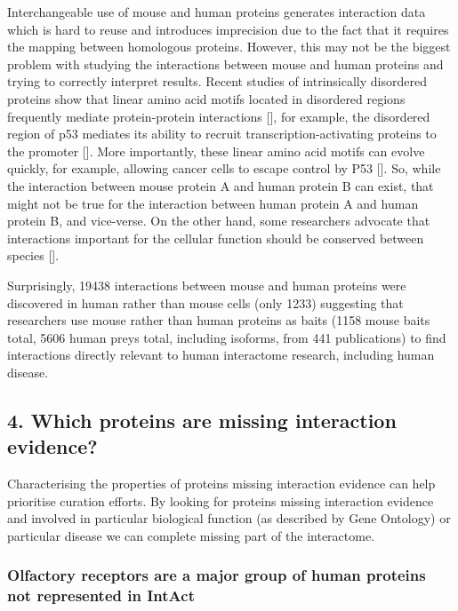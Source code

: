 \documentclass[]{article}
\begin{document}
Interchangeable use of mouse and human proteins generates interaction
data which is hard to reuse and introduces imprecision due to the fact
that it requires the mapping between homologous proteins. However, this
may not be the biggest problem with studying the interactions between
mouse and human proteins and trying to correctly interpret results.
Recent studies of intrinsically disordered proteins show that linear
amino acid motifs located in disordered regions frequently mediate
protein-protein interactions {[}{]}, for example, the disordered region
of p53 mediates its ability to recruit transcription-activating proteins
to the promoter {[}{]}. More importantly, these linear amino acid motifs
can evolve quickly, for example, allowing cancer cells to escape control
by P53 {[}{]}. So, while the interaction between mouse protein A and
human protein B can exist, that might not be true for the interaction
between human protein A and human protein B, and vice-verse. On the
other hand, some researchers advocate that interactions important for
the cellular function should be conserved between species {[}{]}.

Surprisingly, 19438 interactions between mouse and human proteins were
discovered in human rather than mouse cells (only 1233) suggesting that
researchers use mouse rather than human proteins as baits (1158 mouse
baits total, 5606 human preys total, including isoforms, from 441
publications) to find interactions directly relevant to human
interactome research, including human disease.

\subsection{4. Which proteins are missing interaction
evidence?}\label{which-proteins-are-missing-interaction-evidence}

Characterising the properties of proteins missing interaction evidence
can help prioritise curation efforts. By looking for proteins missing
interaction evidence and involved in particular biological function (as
described by Gene Ontology) or particular disease we can complete
missing part of the interactome.

\subsubsection{Olfactory receptors are a major group of human proteins
not represented in
IntAct}\label{olfactory-receptors-are-a-major-group-of-human-proteins-not-represented-in-intact}
\end{document}
